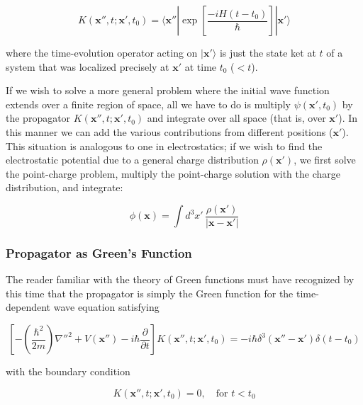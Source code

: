 \documentclass[11pt,a4paper]{article}
\begin{document}
\begin{equation}
\boxed{K(\mathbf{x}'', t; \mathbf{x}', t_0) = \langle \mathbf{x}''|\exp\left[\frac{-iH(t - t_0)}{\hbar}\right]|\mathbf{x}'\rangle}
\tag{2.274}
\end{equation}

where the time-evolution operator acting on $|\mathbf{x}'\rangle$ is just the state ket at $t$ of a system that was localized precisely at $\mathbf{x}'$ at time $t_0$ ($< t$).

If we wish to solve a more general problem where the initial wave function extends over a finite region of space, all we have to do is multiply $\psi(\mathbf{x}', t_0)$ by the propagator $K(\mathbf{x}'', t; \mathbf{x}', t_0)$ and integrate over all space (that is, over $\mathbf{x}'$). In this manner we can add the various contributions from different positions ($\mathbf{x}'$). This situation is analogous to one in electrostatics; if we wish to find the electrostatic potential due to a general charge distribution $\rho(\mathbf{x}')$, we first solve the point-charge problem, multiply the point-charge solution with the charge distribution, and integrate:

\begin{equation}
\phi(\mathbf{x}) = \int d^3x'\,\frac{\rho(\mathbf{x}')}{|\mathbf{x} - \mathbf{x}'|}
\tag{2.275}
\end{equation}

\subsubsection{Propagator as Green's Function}

The reader familiar with the theory of Green functions must have recognized by this time that the propagator is simply the Green function for the time-dependent wave equation satisfying

\begin{equation}
\left[-\left(\frac{\hbar^2}{2m}\right)\nabla''^2 + V(\mathbf{x}'') - i\hbar\frac{\partial}{\partial t}\right]K(\mathbf{x}'', t; \mathbf{x}', t_0) = -i\hbar\delta^3(\mathbf{x}'' - \mathbf{x}')\delta(t - t_0)
\tag{2.276}
\end{equation}

with the boundary condition

\begin{equation}
K(\mathbf{x}'', t; \mathbf{x}', t_0) = 0, \quad \text{for } t < t_0
\tag{2.277}
\end{equation}
\end{document}
